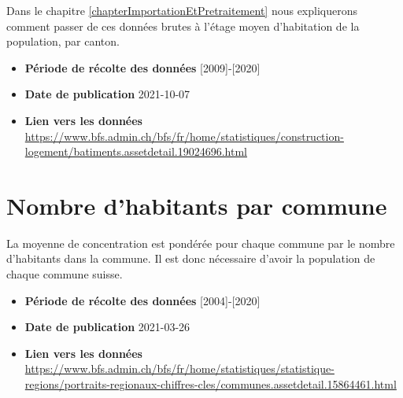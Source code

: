 Dans le chapitre \ref{chapterImportationEtPretraitement} nous expliquerons comment passer de ces données brutes à l'étage moyen d'habitation de la population, par canton.

\begin{itemize}
\item \textbf{Période de récolte des données} [2009]-[2020]
\item \textbf{Date de publication} 2021-10-07
\item \textbf{Lien vers les données} \url{https://www.bfs.admin.ch/bfs/fr/home/statistiques/construction-logement/batiments.assetdetail.19024696.html}
\end{itemize}


\section{Nombre d'habitants par commune}\label{sectionNombreHabitantsCommunes}
La moyenne de concentration est pondérée pour chaque commune par le nombre d'habitants dans la commune. Il est donc nécessaire d'avoir la population de chaque commune suisse. 

\begin{itemize}
\item \textbf{Période de récolte des données} [2004]-[2020]
\item \textbf{Date de publication} 2021-03-26
\item \textbf{Lien vers les données} \url{https://www.bfs.admin.ch/bfs/fr/home/statistiques/statistique-regions/portraits-regionaux-chiffres-cles/communes.assetdetail.15864461.html}
\end{itemize} 